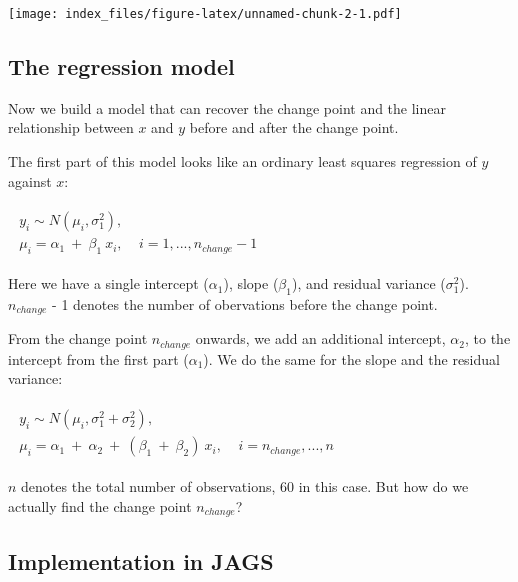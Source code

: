 \documentclass[]{article}
\begin{document}
\texttt{[image: index\_files/figure-latex/unnamed-chunk-2-1.pdf]}

\subsection{The regression model}\label{the-regression-model}

Now we build a model that can recover the change point and the linear
relationship between \(x\) and \(y\) before and after the change point.

The first part of this model looks like an ordinary least squares
regression of \(y\) against \(x\):

\(\begin{aligned} \begin{equation} \begin{array}{l} y_i \sim N(\mu_i, \sigma_1^2), ~~\\ \mu_i = \alpha_1~+~\beta_1~x_i, ~~~~~ i = 1,...,n_{change}-1 \end{array} \end{equation} \end{aligned}\)

Here we have a single intercept (\(\alpha_1\)), slope (\(\beta_1\)), and
residual variance (\(\sigma^2_1\)). \(n_{change}\) - 1 denotes the
number of obervations before the change point.

From the change point \(n_{change}\) onwards, we add an additional
intercept, \(\alpha_2\), to the intercept from the first part
(\(\alpha_1\)). We do the same for the slope and the residual variance:

\(\begin{aligned} \begin{equation} \begin{array}{l} y_i \sim N(\mu_i, \sigma_1^2+\sigma_2^2), ~~\\ \mu_i = \alpha_1~+~\alpha_2~+~(\beta_1~+~\beta_2)~x_i, ~~~~~ i = n_{change},...,n \end{array} \end{equation} \end{aligned}\)

\(n\) denotes the total number of observations, 60 in this case. But how
do we actually find the change point \(n_{change}\)?

\subsection{Implementation in JAGS}\label{implementation-in-jags}
\end{document}
